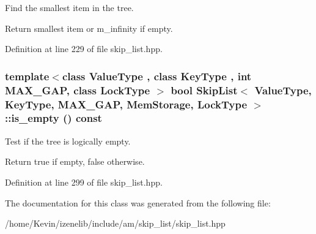 Find the smallest item in the tree. 

Return smallest item or m\_\-infinity if empty. 

Definition at line 229 of file skip\_\-list.hpp.\hypertarget{classSkipList_3_01ValueType_00_01KeyType_00_01MAX__GAP_00_01MemStorage_00_01LockType_01_4_fa6a9e000dee4c64e85d3e4ada7efae1}{
\subsubsection[{is\_\-empty}]{\setlength{\rightskip}{0pt plus 5cm}template$<$class ValueType , class KeyType , int MAX\_\-GAP, class LockType $>$ bool SkipList$<$ ValueType, KeyType, MAX\_\-GAP, MemStorage, LockType $>$::is\_\-empty () const}}
\label{classSkipList_3_01ValueType_00_01KeyType_00_01MAX__GAP_00_01MemStorage_00_01LockType_01_4_fa6a9e000dee4c64e85d3e4ada7efae1}


Test if the tree is logically empty. 

Return true if empty, false otherwise. 

Definition at line 299 of file skip\_\-list.hpp.

The documentation for this class was generated from the following file:\begin{CompactItemize}
\item 
/home/Kevin/izenelib/include/am/skip\_\-list/skip\_\-list.hpp\end{CompactItemize}

